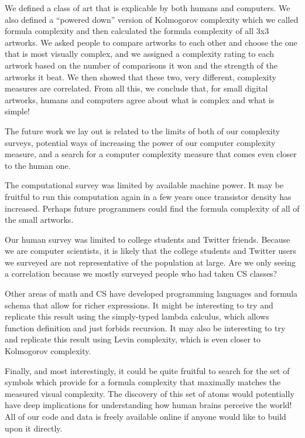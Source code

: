 \documentclass[11pt]{article}
\begin{document}
We defined a class of art that is explicable by both humans and computers.  We
also defined a ``powered down'' version of Kolmogorov complexity which we
called formula complexity and then calculated the formula complexity of all 3x3
artworks.  We asked people to compare artworks to each other and choose the one
that is most visually complex, and we assigned a complexity rating to each
artwork based on the number of comparisons it won and the strength of the
artworks it beat.  We then showed that these two, very different, complexity
measures are correlated.  From all this, we conclude that, for small digital
artworks, humans and computers agree about what is complex and what is simple!

The future work we lay out is related to the limits of both of our complexity
surveys, potential ways of increasing the power of our computer complexity
measure, and a search for a computer complexity measure that comes even closer
to the human one.

The computational survey was limited by available machine power.
It may be fruitful to run this computation again in a few years once transistor
density has increased.  Perhaps future programmers could find the formula
complexity of all of the small artworks.

Our human survey was limited to college students and Twitter friends.  Because
we are computer scientists, it is likely that the college students and
Twitter users we surveyed are not representative of the population at large.
Are we only seeing a correlation because we mostly surveyed people who had
taken CS classes? 

Other areas of math and CS have developed programming languages and formula
schema that allow for richer expressions. It might be interesting to try and
replicate this result using the simply-typed lambda calculus, which allows
function definition and just forbids recursion.  It may also be interesting to
try and replicate this result using Levin complexity, which is even closer to
Kolmogorov complexity.

Finally, and most interestingly, it could be quite fruitful to search for the
set of symbols which provide for a formula complexity that maximally matches the
measured visual complexity.  The discovery of this set of atoms would
potentially have deep implications for understanding how human brains perceive
the world!  All of our code and data is freely available online\cite{Github} if
anyone would like to build upon it directly.

 
\end{document}
